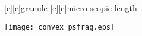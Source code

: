 \documentclass{article}
\begin{document}
\begin{figure}[htb]
  \begin{center}

        [c][c]{\hspace{4mm}granule}
        [c][c]{\hspace{-4mm}micro scopic length}


    \texttt{[image: convex\_psfrag.eps]}
    \end{center}
\end{figure}
\end{document}
